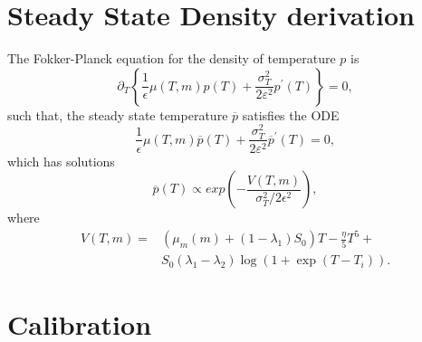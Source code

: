 \documentclass[../../main.tex]{subfiles}
\begin{document}
\section{Steady State Density derivation} \label{appendix:density}

The Fokker-Planck equation for the density of temperature $p$ is \begin{equation}
    \partial_T \left\{ \frac{1}{\epsilon} \mu(T, m) p(T) + \frac{\sigma^2_T}{2\varepsilon^2} p^\prime(T) \right\} = 0,
\end{equation} such that, the steady state temperature $\overline{p}$ satisfies the ODE \begin{equation}
    \frac{1}{\epsilon} \mu(T, m) \overline{p}(T) + \frac{\sigma^2_T}{2\varepsilon^2} \overline{p}^\prime(T) = 0,
\end{equation} which has solutions \begin{equation}
    \overline{p}(T) \propto exp\left( -\frac{V(T, m)}{\sigma^2_T / 2\epsilon^2} \right), 
\end{equation} where \begin{equation}
    \begin{split}
        V(T, m) = &(\mu_m(m) + (1 - \lambda_1)S_0) T - \frac{\eta}{5} T^5 + \\
        &S_0 (\lambda_1 - \lambda_2) \log(1 + \exp(T - T_i)).
    \end{split}
\end{equation}

\section{Calibration} \label{appendix:calibration}
\end{document}

